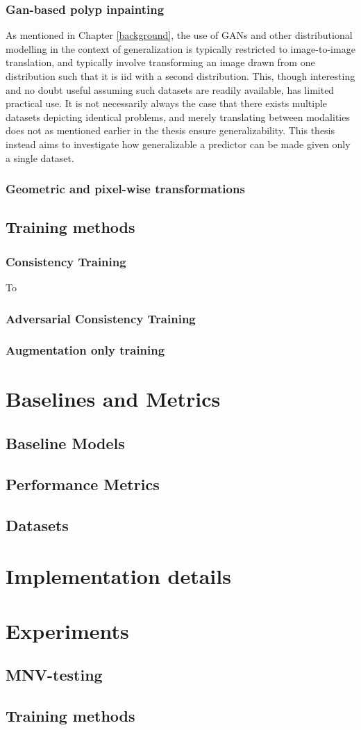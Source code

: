     \subsubsection{Gan-based polyp inpainting}
    As mentioned in Chapter \ref{background}, the use of GANs and other distributional modelling in the context of generalization is typically restricted to image-to-image translation, and typically involve transforming an image drawn from one distribution such that it is iid with a second distribution. This, though interesting and no doubt useful assuming such datasets are readily available, has limited practical use. It is not necessarily always the case that there exists multiple datasets depicting identical problems, and merely translating between modalities does not as mentioned earlier in the thesis ensure generalizability. This thesis instead aims to investigate how generalizable a predictor can be made given only a single dataset. %
    \subsubsection{Geometric and pixel-wise transformations}
    \subsection{Training methods}
        \subsubsection{Consistency Training}
            To 
        \subsubsection{Adversarial Consistency Training}
        \subsubsection{Augmentation only training}
\section{Baselines and Metrics}
    \subsection{Baseline Models}
    \subsection{Performance Metrics}
    \subsection{Datasets}
\section{Implementation details}
\section{Experiments}
    \subsection{MNV-testing}
	\subsection{Training methods}
